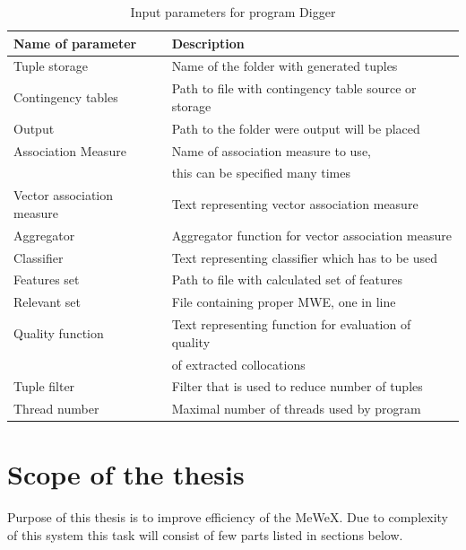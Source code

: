 \begin{table}[t]
    \centering
    \begin{tabular*}{0.9\textwidth}{|l @{\extracolsep{\fill}} l|}
        \hline 
        \textbf{Name of parameter} & \textbf{Description} \\
        \hline
        Tuple storage & Name of the folder with generated tuples \\
        \hline
        Contingency tables & Path to file with contingency table source or storage \\
        \hline
        Output & Path to the folder were output will be placed \\
        \hline
        Association Measure & Name of association measure to use, \\& this can be specified many times \\
        \hline
        Vector association measure & Text representing vector association measure \\
        \hline
        Aggregator & Aggregator function for vector association measure \\
        \hline
        Classifier & Text representing classifier which has to be used \\
        \hline
        Features set & Path to file with calculated set of features \\
        \hline
        Relevant set & File containing proper MWE, one in line \\
        \hline
        Quality function & Text representing function for evaluation of quality \\& of extracted collocations \\
        \hline
        Tuple filter & Filter that is used to reduce number of tuples \\
        \hline
        Thread number & Maximal number of threads used by program \\
        \hline
    \end{tabular*} 
    \caption{Input parameters for program Digger}
    \label{tbl_workflow2}
\end{table}

\section{Scope of the thesis}
Purpose of this thesis is to improve efficiency of the MeWeX. Due to complexity of this system this task 
will consist of few parts listed in sections below.

